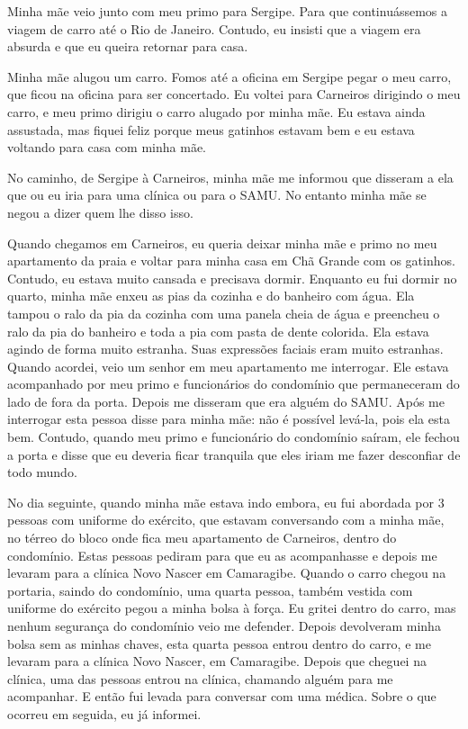 \documentclass[11pt]{book}
\begin{document}
Minha mãe veio junto com meu primo para Sergipe. Para que continuássemos a viagem de carro até o Rio de Janeiro. Contudo, eu insisti que a viagem era absurda e que eu queira retornar para casa. 

Minha mãe alugou um carro. Fomos até a oficina em Sergipe pegar o meu carro, que ficou na oficina para ser concertado. Eu voltei para Carneiros dirigindo o meu carro, e meu primo dirigiu o carro alugado por minha mãe. Eu estava ainda assustada, mas fiquei feliz porque meus gatinhos estavam bem e eu estava voltando para casa com minha mãe.

No caminho, de Sergipe à Carneiros, minha mãe me informou que disseram a ela que ou eu iria para uma clínica ou para o SAMU. No entanto minha mãe se negou a dizer quem lhe disso isso.

Quando chegamos em Carneiros, eu queria deixar minha mãe e primo no meu apartamento da praia e voltar para minha casa em Chã Grande com os gatinhos. Contudo, eu estava muito cansada e precisava dormir. Enquanto eu fui dormir no quarto, minha mãe enxeu as pias da cozinha e do banheiro com água. Ela tampou o ralo da pia da cozinha com uma panela cheia de água e preencheu o ralo da pia do banheiro e toda a pia com pasta de dente colorida. Ela estava agindo de forma muito estranha. Suas expressões faciais eram muito estranhas. Quando acordei, veio um senhor em meu apartamento me interrogar. Ele estava acompanhado por meu primo e funcionários do condomínio que permaneceram do lado de fora da porta. Depois me disseram que era alguém do SAMU. Após me interrogar esta pessoa disse para minha mãe: não é possível levá-la, pois ela esta bem. Contudo, quando meu primo e funcionário do condomínio saíram, ele fechou a porta e disse que eu deveria ficar tranquila que eles iriam me fazer desconfiar de todo mundo. 

No dia seguinte, quando minha mãe estava indo embora, eu fui abordada por 3 pessoas com uniforme do exército, que estavam conversando com a minha mãe, no térreo do bloco onde fica meu apartamento de Carneiros, dentro do condomínio. Estas pessoas pediram para que eu as acompanhasse e depois me levaram para a clínica Novo Nascer em Camaragibe. Quando o carro chegou na portaria, saindo do condomínio, uma quarta pessoa, também vestida com uniforme do exército pegou a minha bolsa à força. Eu gritei dentro do carro, mas nenhum segurança do condomínio veio me defender. Depois devolveram minha bolsa sem as minhas chaves, esta quarta pessoa entrou dentro do carro, e me levaram para a clínica Novo Nascer, em Camaragibe. Depois que cheguei na clínica, uma das pessoas entrou na clínica, chamando alguém para me acompanhar. E então fui levada para conversar com uma médica. Sobre o que ocorreu em seguida, eu já informei. 
\end{document}
